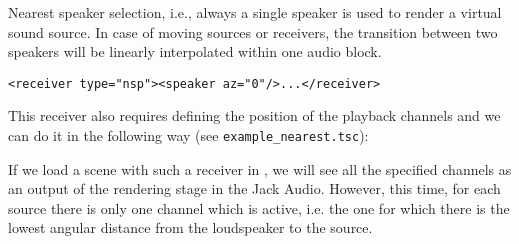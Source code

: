 Nearest speaker selection, i.e., always a single speaker is used to
render a virtual sound source. In case of moving sources or receivers,
the transition between two speakers will be linearly interpolated
within one audio block.

\begin{lstlisting}[numbers=none]
<receiver type="nsp"><speaker az="0"/>...</receiver>
\end{lstlisting}
%
This receiver also requires defining the position of the playback
channels and we can do it in the following way (see
\verb!example_nearest.tsc!):


If we load a scene with such a receiver in \tascar{}, we will see all the
specified channels as an output of the rendering stage in the Jack
Audio. 
%
However, this time, for each source there is only one channel which is
active, i.e. the one for which there is the lowest angular distance
from the loudspeaker to the source.

